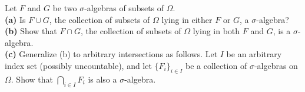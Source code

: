 \begin{exercise}
    Let \( F \) and \( G \) be two \(\sigma\)-algebras of subsets of \(\Omega\). \\
    \textbf{(a)} Is \( F \cup G \), the collection of subsets of \(\Omega\) lying in either \( F \) or \( G \), a \(\sigma\)-algebra?\\
    \textbf{(b)} Show that \( F \cap G \), the collection of subsets of \(\Omega\) lying in both \( F \) and \( G \), is a \(\sigma\)-algebra.\\
    \textbf{(c)} Generalize (b) to arbitrary intersections as follows. Let \( I \) be an arbitrary index set (possibly uncountable), and let \( \{F_i\}_{i \in I} \) be a collection of \(\sigma\)-algebras on \(\Omega\). Show that \( \bigcap_{i \in I} F_i \) is also a \(\sigma\)-algebra.
\end{exercise}


